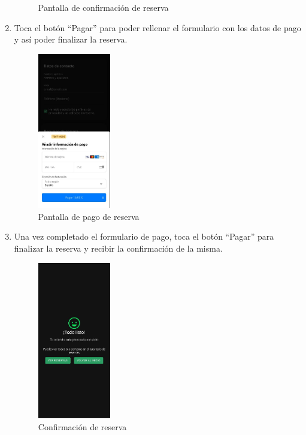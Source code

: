 \begin{enumerate}
\begin{figure}[H]
		      \caption{Pantalla de confirmación de reserva}
	      \end{figure}
	\item Toca el botón “Pagar” para poder rellenar el formulario con los datos de pago y así poder finalizar la reserva.
	      \begin{figure}[H]
		      \centering
		      \includegraphics[width=0.3\textwidth]{7-Construccion/Manuales/app/P3-Reservar.png}
		      \caption{Pantalla de pago de reserva}
	      \end{figure}
	\item Una vez completado el formulario de pago, toca el botón “Pagar” para finalizar la reserva y recibir la confirmación de la misma.
	      \begin{figure}[H]
		      \centering
		      \includegraphics[width=0.3\textwidth]{7-Construccion/Manuales/app/P4-Reservar.png}
		      \caption{Confirmación de reserva}
	      \end{figure}
\end{enumerate}

